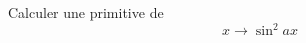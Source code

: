 Calculer une primitive de 
\begin{displaymath}
 x \rightarrow \sin^2 ax
\end{displaymath}
\bigskip \bigskip